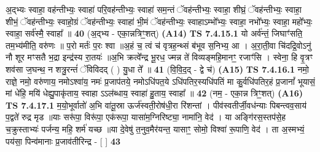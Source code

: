 \documentclass[17pt]{extarticle}
\begin{document}
                  अ॒द्भ्यः स्वाहा॒ वह॑न्तीभ्यः॒ स्वाहा॑ परि॒वह॑न्तीभ्यः॒ स्वाहा॑ सम॒न्तं ॅवह॑न्तीभ्यः॒ स्वाहा॒ शीघ्रं॒ ॅवह॑न्तीभ्यः॒ स्वाहा॒ शीभं॒ ॅवह॑न्तीभ्यः॒ स्वाहो॒ग्रं ॅवह॑न्तीभ्यः॒ स्वाहा॑ भी॒मं ॅवह॑न्तीभ्यः॒ स्वाहाऽम्भो᳚भ्यः॒ स्वाहा॒ नभो᳚भ्यः॒ स्वाहा॒ महो᳚भ्यः॒ स्वाहा॒ सर्व॑स्मै॒ स्वाहा᳚ ॥ \textbf{  40} \newline
                  \newline
                      (अ॒द्भ्य - एका॒न्नत्रिꣳ॒॒शत्)  \textbf{(A14)} \newline \newline
                                        \textbf{ TS 7.4.15.1} \newline
                  यो अर्व॑न्तं॒ जिघाꣳ॑सति॒ तम॒भ्य॑मीति॒ वरु॑णः ॥ प॒रो मर्तः॑ प॒रः श्वा ॥अ॒हं च॒ त्वं च॑ वृत्रह॒न्थ्सं ब॑भूव स॒निभ्य॒ आ । अ॒रा॒ती॒वा चि॑दद्रि॒वोऽनु॑ नौ शूर मꣳसतै भ॒द्रा इन्द्र॑स्य रा॒तयः॑ ॥अ॒भि क्रत्वे᳚न्द्र भू॒रध॒ ज्मन्न ते॑ विव्यङ्महि॒मानꣳ॒॒ रजाꣳ॑सि । स्वेना॒ हि वृ॒त्रꣳ शव॑सा ज॒घन्थ॒ न शत्रु॒रन्तं॑ ॅविविदद् ( ) यु॒धा ते᳚ ॥ \textbf{  41} \newline
                  \newline
                      (वि॒वि॒द॒द् - द्वे च॑)  \textbf{(A15)} \newline \newline
                                        \textbf{ TS 7.4.16.1} \newline
                  नमो॒ राज्ञे॒ नमो॒ वरु॑णाय॒ नमोऽश्वा॑य॒ नमः॑ प्र॒जाप॑तये॒ नमोऽधि॑पत॒ये ऽधि॑पतिर॒स्यधि॑पतिं मा कु॒र्वधि॑पतिर॒हं प्र॒जानां᳚ भूयासं॒ मां धे॑हि॒ मयि॑ धेह्यु॒पाकृ॑ताय॒ स्वाहा ऽऽल॑ब्धाय॒ स्वाहा॑ हु॒ताय॒ स्वाहा᳚ ॥ \textbf{  42} \newline
                  \newline
                      (नम॒ - एका॒न्न त्रिꣳ॒॒शत्)  \textbf{(A16)} \newline \newline
                                        \textbf{ TS 7.4.17.1} \newline
                  म॒यो॒भूर्वातो॑ अ॒भि वा॑तू॒स्रा ऊर्ज॑स्वती॒रोष॑धी॒रा रि॑शन्तां । पीव॑स्वतीर्जी॒वध॑न्याः पिबन्त्वव॒साय॑ प॒द्वते॑ रुद्र मृड ॥याः सरू॑पा॒ विरू॑पा॒ एक॑रूपा॒ यासा॑म॒ग्निरिष्ट्या॒ नामा॑नि॒ वेद॑ । या अङ्गि॑रस॒स्तप॑से॒ह च॒क्रुस्ताभ्यः॑ पर्जन्य॒ महि॒ शर्म॑ यच्छ ॥या दे॒वेषु॑ त॒नुव॒मैर॑यन्त॒ यासाꣳ॒॒ सोमो॒ विश्वा॑ रू॒पाणि॒ वेद॑ । ता अ॒स्मभ्यं॒ पय॑सा॒ पिन्व॑मानाः प्र॒जाव॑तीरिन्द्र - [  ] \textbf{  43} \newline
                  \newline
\end{document}
